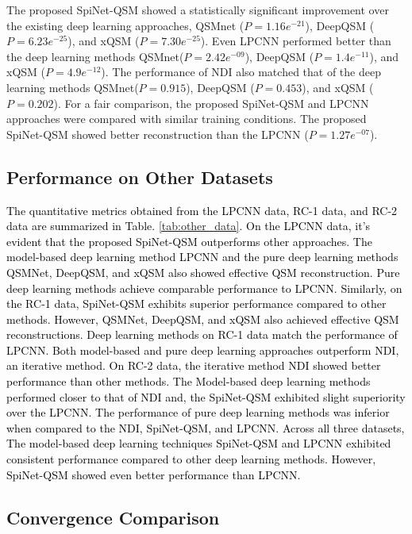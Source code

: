 \documentclass[sn-vancouver,Numbered]{sn-jnl}%
\begin{document}
 The proposed SpiNet-QSM showed a statistically significant improvement over the existing deep learning approaches, QSMnet ($P=1.16e^{-21}$), DeepQSM ($P=6.23e^{-25}$), and xQSM ($P=7.30e^{-25}$). Even LPCNN performed better than the deep learning methods QSMnet($P=2.42e^{-09}$), DeepQSM ($P=1.4e^{-11}$), and xQSM ($P=4.9e^{-12}$). The performance of NDI also matched that of the deep learning methods QSMnet($P=0.915$), DeepQSM ($P=0.453$), and xQSM ($P=0.202$). For a fair comparison, the proposed SpiNet-QSM and LPCNN approaches were compared with similar training conditions. The proposed SpiNet-QSM showed better reconstruction than the LPCNN ($P=1.27e^{-07}$). 
 

\subsection{Performance on Other Datasets}
\textcolor{black}{
The quantitative metrics obtained from the LPCNN data, RC-1 data, and RC-2 data are summarized in Table. \ref{tab:other_data}. On the LPCNN data, it's evident that the proposed SpiNet-QSM outperforms other approaches. The model-based deep learning method LPCNN and the pure deep learning methods QSMNet, DeepQSM, and xQSM also showed effective QSM reconstruction. Pure deep learning methods achieve comparable performance to LPCNN. Similarly, on the RC-1 data, SpiNet-QSM exhibits superior performance compared to other methods. However, QSMNet, DeepQSM, and xQSM also achieved effective QSM reconstructions. Deep learning methods on RC-1 data match the performance of LPCNN. Both model-based and pure deep learning approaches outperform NDI, an iterative method. On RC-2 data, the iterative method NDI showed better performance than other methods. The Model-based deep learning methods performed closer to that of NDI and, the SpiNet-QSM exhibited slight superiority over the LPCNN. The performance of pure deep learning methods was inferior when compared to the NDI, SpiNet-QSM, and LPCNN. 
Across all three datasets, The model-based deep learning techniques  SpiNet-QSM and LPCNN exhibited consistent performance compared to other deep learning methods. However, SpiNet-QSM showed even better performance than LPCNN.}


\subsection{Convergence Comparison}
\end{document}

